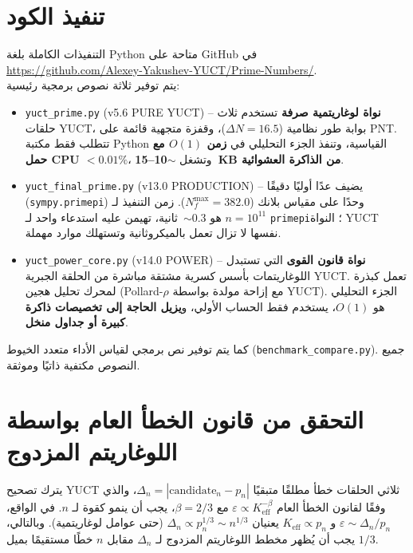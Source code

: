 \documentclass[11pt,a4paper]{article}
\begin{document}
	\section{تنفيذ الكود}
	\label{sec:code}
	التنفيذات الكاملة بلغة Python متاحة على GitHub في \\
	\url{https://github.com/Alexey-Yakushev-YUCT/Prime-Numbers/}. \\
	يتم توفير ثلاثة نصوص برمجية رئيسية:
	
	\begin{itemize}
		\item \texttt{yuct\_prime.py} (v5.6 PURE YUCT) – \textbf{نواة لوغاريتمية صرفة} تستخدم ثلاث حلقات YUCT، بوابة طور نظامية (\(\Delta N = 16.5\))، وقفزة متجهية قائمة على PNT. تتطلب فقط مكتبة Python القياسية، وتنفذ الجزء التحليلي في \textbf{زمن \(O(1)\) مع حمل CPU \(<0.01\%\)}، وتشغل \textbf{\(\sim\)10–15~KB من الذاكرة العشوائية}.
		\item \texttt{yuct\_final\_prime.py} (v13.0 PRODUCTION) – يضيف عدًا أوليًا دقيقًا (\texttt{sympy.primepi}) وحدًا على مقياس بلانك (\(N_f^{\max}=382.0\)). زمن التنفيذ لـ \(n=10^{11}\) هو \(\sim 0.3\)~ثانية، تهيمن عليه استدعاء واحد لـ \texttt{primepi}؛ النواة YUCT نفسها لا تزال تعمل بالميكروثانية وتستهلك موارد مهملة.
		\item \texttt{yuct\_power\_core.py} (v14.0 POWER) – \textbf{نواة قانون القوى} التي تستبدل اللوغاريتمات بأسس كسرية مشتقة مباشرة من الحلقة الجبرية YUCT. تعمل كبذرة لمحرك تحليل هجين (Pollard-\(\rho\) مع إزاحة مولدة بواسطة YUCT). الجزء التحليلي هو \(O(1)\)، يستخدم فقط الحساب الأولي، و\textbf{يزيل الحاجة إلى تخصيصات ذاكرة كبيرة أو جداول منخل}.
	\end{itemize}
	
	كما يتم توفير نص برمجي لقياس الأداء متعدد الخيوط (\texttt{benchmark\_compare.py}). جميع النصوص مكتفية ذاتيًا وموثقة.
	
	\section{التحقق من قانون الخطأ العام بواسطة اللوغاريتم المزدوج}
	\label{sec:loglog}
	
	يترك تصحيح YUCT ثلاثي الحلقات خطأ مطلقًا متبقيًا \(\Delta_n = |\text{candidate}_n - p_n|\)، والذي وفقًا لقانون الخطأ العام \(\varepsilon \propto K_{\mathrm{eff}}^{-\beta}\) مع \(\beta=2/3\)، يجب أن ينمو كقوة لـ \(n\). في الواقع، \(\varepsilon \sim \Delta_n / p_n\) و \(K_{\mathrm{eff}} \propto p_n\) يعنيان \(\Delta_n \propto p_n^{1/3} \sim n^{1/3}\) (حتى عوامل لوغاريتمية). وبالتالي، يجب أن يُظهر مخطط اللوغاريتم المزدوج لـ \(\Delta_n\) مقابل \(n\) خطًا مستقيمًا بميل \(1/3\).
	
\end{document}
